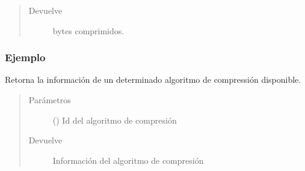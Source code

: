 \documentclass[a4paper,12pt,spanish]{sphinxmanual}
\begin{document}
\begin{fulllineitems}
\begin{fulllineitems}
\begin{quote}
\begin{description}
\item[{Devuelve}] \leavevmode
bytes comprimidos.

\end{description}\end{quote}
\subsubsection*{Ejemplo}

\begin{sphinxVerbatim}[commandchars=\\\{\}]
   
   
  
\end{sphinxVerbatim}

\end{fulllineitems}


\begin{fulllineitems}
\label{\detokenize{openerm.Compressor:openerm.Compressor.Compressor.compression_type_info}}
Retorna la información de un determinado
algoritmo de compressión disponible.
\begin{quote}\begin{description}
\item[{Parámetros}] \leavevmode
{} () \textendash{} Id del algoritmo de compresión

\item[{Devuelve}] \leavevmode
Información del algoritmo de compresión


\end{description}
\end{quote}
\end{fulllineitems}
\end{fulllineitems}
\end{document}
